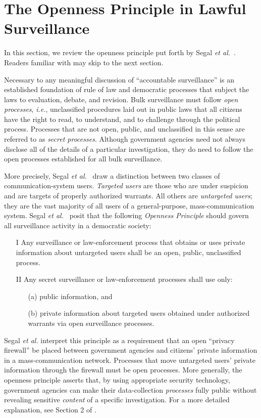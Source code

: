 \section{The Openness Principle in Lawful Surveillance}
In this section, we review the openness principle put forth by Segal 
{\it et al.}~\cite{sff-foci2014}.  Readers familiar with \cite{sff-foci2014} 
may skip to the next section.

Necessary to any meaningful discussion of ``accountable surveillance'' is an
established foundation of rule of law and democratic processes that subject
the laws to evaluation, debate, and revision.  Bulk surveillance must follow
{\it open processes}, {\it i.e.}, unclassified procedures laid out in public 
laws that all citizens have the right to read, to understand, and to challenge
through the political process.  Processes that are not open, public, and
unclassified in this sense are referred to as {\it secret processes}.  
Although government agencies need not always disclose all of the details of a 
particular investigation, they do need to follow the open processes 
established for all bulk surveillance.


More precisely, Segal {\it et al.}~\cite{sff-foci2014} draw a distinction 
between two classes of communication-system users.  {\it Targeted users} are 
those who are under suspicion and are targets of properly authorized warrants.
All others are {\it untargeted users}; they are the vast majority of all 
users of a general-purpose, mass-communication system.  Segal {\it et 
al.}~\cite{sff-foci2014} posit that the
following {\it Openness Principle} should govern all surveillance activity
in a democratic society:

\begin{enumerate}
\item[I]
Any surveillance or law-enforcement process
that obtains or uses private information
about untargeted users shall be
an open, public, unclassified process.
\item[II]
Any secret surveillance or law-enforcement processes shall use only:
\begin{enumerate}
\item[(a)] public information, and
\item[(b)] private information about targeted users obtained under 
authorized warrants via open surveillance processes.
\end{enumerate}
\end{enumerate}
Segal {\it et al.} interpret this principle as a requirement that an open
``privacy firewall'' be placed between government agencies and citizens'
private information in a mass-communication network.  Processes that move
untargeted users' private information through the firewall must be open
processes.  More generally, the openness principle asserts that, by using
appropriate security technology, government agencies can make their 
data-collection {\it processes} fully public without revealing sensitive
{\it content} of a specific investigation.  For a more detailed explanation,
see Section 2 of \cite{sff-foci2014}.

